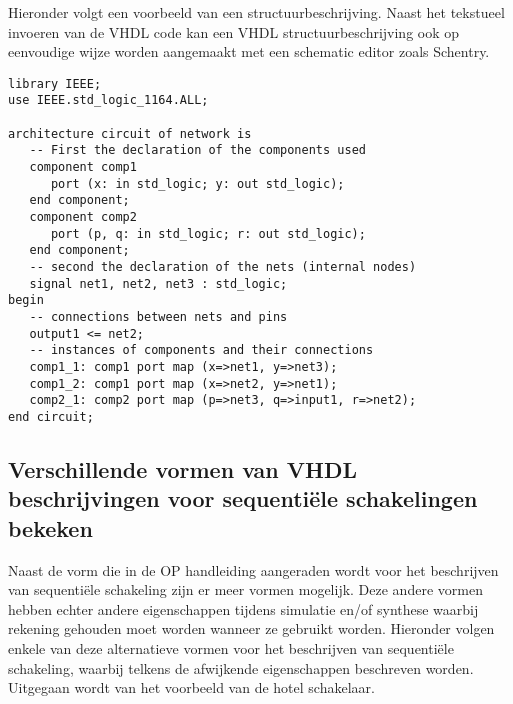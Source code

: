 Hieronder volgt een voorbeeld van een structuurbeschrijving.
Naast het tekstueel invoeren van de VHDL code kan een
VHDL structuurbeschrijving ook op eenvoudige wijze worden
aangemaakt met een schematic editor zoals Schentry.
\begin{verbatim}
library IEEE;
use IEEE.std_logic_1164.ALL;

architecture circuit of network is
   -- First the declaration of the components used
   component comp1
      port (x: in std_logic; y: out std_logic);
   end component;
   component comp2
      port (p, q: in std_logic; r: out std_logic);
   end component;
   -- second the declaration of the nets (internal nodes)
   signal net1, net2, net3 : std_logic;
begin
   -- connections between nets and pins
   output1 <= net2;
   -- instances of components and their connections 
   comp1_1: comp1 port map (x=>net1, y=>net3);
   comp1_2: comp1 port map (x=>net2, y=>net1);
   comp2_1: comp2 port map (p=>net3, q=>input1, r=>net2);
end circuit;
\end{verbatim}

\subsection{Verschillende vormen van VHDL beschrijvingen voor sequenti\"ele schakelingen bekeken}

Naast de vorm die in de OP handleiding aangeraden wordt voor het beschrijven van
sequenti\"ele schakeling zijn er meer vormen mogelijk.
Deze andere vormen hebben echter andere eigenschappen tijdens simulatie en/of
synthese waarbij rekening gehouden moet worden wanneer ze gebruikt worden.
Hieronder volgen enkele van deze alternatieve vormen voor het beschrijven
van sequenti\"ele schakeling, waarbij telkens de afwijkende eigenschappen
beschreven worden.
Uitgegaan wordt van het voorbeeld van de hotel schakelaar.


